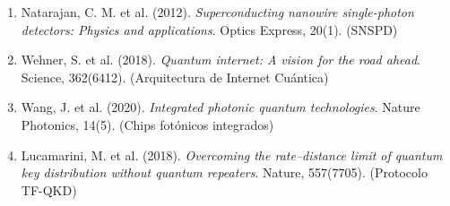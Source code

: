 \documentclass{article}
\begin{document}
\begin{enumerate}
    \item Natarajan, C. M. et al. (2012). \emph{Superconducting nanowire single-photon detectors: Physics and applications}. Optics Express, 20(1). (SNSPD)
    
    \item Wehner, S. et al. (2018). \emph{Quantum internet: A vision for the road ahead}. Science, 362(6412). (Arquitectura de Internet Cuántica)
    
    \item Wang, J. et al. (2020). \emph{Integrated photonic quantum technologies}. Nature Photonics, 14(5). (Chips fotónicos integrados)
    
    \item Lucamarini, M. et al. (2018). \emph{Overcoming the rate–distance limit of quantum key distribution without quantum repeaters}. Nature, 557(7705). (Protocolo TF-QKD)
\end{enumerate}
\end{document}
